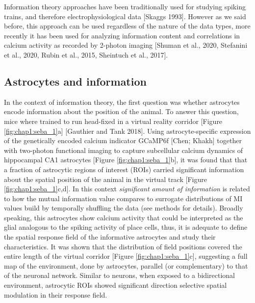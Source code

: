Information theory approaches have been traditionally used for studying spiking trains, and therefore electrophysiological data [Skaggs 1993].
However as we said before, this approach can be used regardless of the nature of the data types, more recently it has been used for analyzing information content and correlations in calcium activity as recorded by 2-photon imaging [Shuman et al., 2020, Stefanini et al., 2020, Rubin et al., 2015, Sheintuch et al., 2017].
\subsection{Astrocytes and information}
\label{chap1:sec:3:subsec2:astro_info}
In the context of information theory, the first question was whether astrocytes encode information about the position of the animal.
To answer this question, mice where trained to run head-fixed in a virtual reality corridor [Figure \ref{fig:chap1:seba_1}a] [Gauthier and Tank 2018].
Using astrocyte-specific expression of the genetically encoded calcium indicator GCaMP6f [Chen; Khakh] together with two-photon functional imaging to capture subcellular calcium dynamics of hippocampal CA1 astrocytes [Figure \ref{fig:chap1:seba_1}b], it was found that that a fraction of astrocytic regions of interest (ROIs) carried significant information about the spatial position of the animal in the virtual track [Figure \ref{fig:chap1:seba_1}c,d].
In this context \textit{significant amount of information} is related to how the mutual information value compares to surrogate distributions of MI values build by temporally shuffling the data (see methods for details). 
Broadly speaking, this astrocytes show calcium activity that could be interpreted as the glial analogous to the spiking activity of place cells, thus, it is adequate to define the spatial response field of the informative astrocytes and study their characteristics.
It was shown that the distribution of field positions covered the entire length of the virtual corridor [Figure \ref{fig:chap1:seba_1}c], suggesting a full map of the environment, done by astrocytes, parallel (or complementary) to that of the neuronal network.
Similar to neurons, when exposed to a bidirectional environment, astrocytic ROIs showed significant direction selective spatial modulation in their response field.

